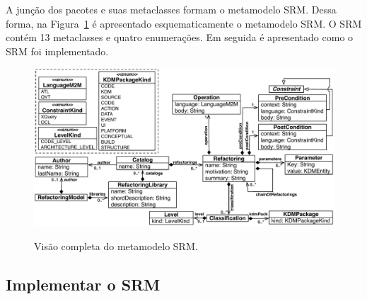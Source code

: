 A junção dos pacotes e suas metaclasses formam o metamodelo SRM. Dessa forma, na Figura~\ref{fig:meta_modelo_SRM} é apresentado esquematicamente o metamodelo SRM. O SRM contém 13 metaclasses e quatro enumerações. Em seguida é apresentado como o SRM foi implementado.

\begin{figure}[h]
	\centering
		\caption{Visão completa do metamodelo SRM.}
	\includegraphics[scale=0.65]{images/newMetamodelSRM2}
	\label{fig:meta_modelo_SRM}
	\fautor
\end{figure}




\subsection{Implementar o SRM}\label{sec:implementacao_do_SRM}

